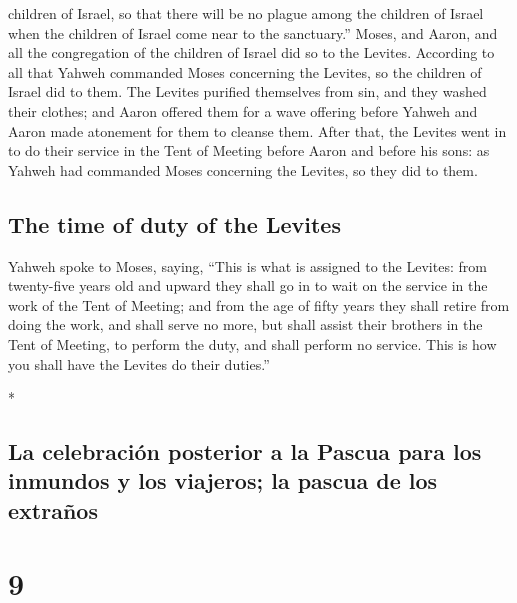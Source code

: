 \begin{paracol}{2}
\begin{otherlanguage}{english}
children of Israel, so that there will be no plague among the children
of Israel when the children of Israel come near to the sanctuary.''
 Moses, and Aaron, and all the congregation of the
children of Israel did so to the Levites. According to all that Yahweh
commanded Moses concerning the Levites, so the children of Israel did to
them.  The Levites purified themselves from sin, and they
washed their clothes; and Aaron offered them for a wave offering before
Yahweh and Aaron made atonement for them to cleanse them.
 After that, the Levites went in to do their service in
the Tent of Meeting before Aaron and before his sons: as Yahweh had
commanded Moses concerning the Levites, so they did to them.

\hypertarget{the-time-of-duty-of-the-levites}{%
\subsection{The time of duty of the
Levites}\label{the-time-of-duty-of-the-levites}}

 Yahweh spoke to Moses, saying,  ``This is
what is assigned to the Levites: from twenty-five years old and upward
they shall go in to wait on the service in the work of the Tent of
Meeting;  and from the age of fifty years they shall
retire from doing the work, and shall serve no more,  but
shall assist their brothers in the Tent of Meeting, to perform the duty,
and shall perform no service. This is how you shall have the Levites do
their duties.''

\end{otherlanguage}

\switchcolumn[0]*

\hypertarget{la-celebraciuxf3n-posterior-a-la-pascua-para-los-inmundos-y-los-viajeros-la-pascua-de-los-extrauxf1os}{%
\subsection{La celebración posterior a la Pascua para los inmundos y los
viajeros; la pascua de los
extraños}\label{la-celebraciuxf3n-posterior-a-la-pascua-para-los-inmundos-y-los-viajeros-la-pascua-de-los-extrauxf1os}}

\hypertarget{section-16}{%
\section{9}\label{section-16}}


\end{paracol}
